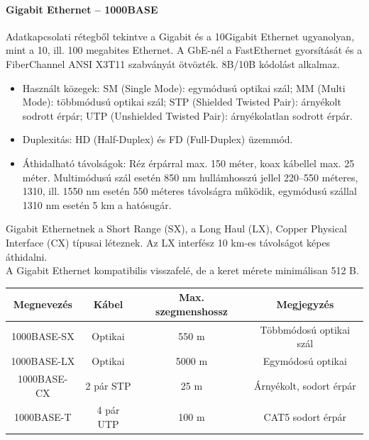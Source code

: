 \paragraph{Gigabit Ethernet -- 1000BASE}
Adatkapcsolati rétegből tekintve a Gigabit és a 10Gigabit Ethernet ugyanolyan, mint a 10, ill. 100 megabites Ethernet. A GbE-nél a FastEthernet gyorsítását és a FiberChannel ANSI X3T11 szabványát ötvözték. 8B/10B kódolást alkalmaz.
\begin{itemize}[nosep]
	\item Használt közegek: SM (Single Mode): egymódusú optikai szál; MM (Multi Mode): többmódusú optikai szál; STP (Shielded Twisted Pair): árnyékolt sodrott érpár; UTP (Unshielded Twisted Pair): árnyékolatlan sodrott érpár.
	\item Duplexitás: HD (Half-Duplex) és FD (Full-Duplex) üzemmód.
	\item Áthidalható távolságok: Réz érpárral max. 150 méter, koax kábellel max. 25 méter. Multimódusú szál esetén 850 nm hullámhosszú jellel 220–550 méteres, 1310, ill. 1550 nm esetén 550 méteres távolságra működik, egymódusú szállal 1310 nm esetén 5 km a hatósugár.
\end{itemize}
Gigabit Ethernetnek a Short Range (SX), a Long Haul (LX), Copper Physical Interface (CX) típusai léteznek. Az LX interfész 10 km-es távolságot képes áthidalni.\\
A Gigabit Ethernet kompatibilis visszafelé, de a keret mérete minimálisan 512 B.\\
\begin{tabular}{|c|c|c|c|}
	\hline 
	Megnevezés & Kábel & Max. szegmenshossz & Megjegyzés \\ 
	\hline 
	1000BASE-SX & Optikai & 550 m & Többmódosú optikai szál \\ 
	\hline 
	1000BASE-LX & Optikai & 5000 m & Egymódosú optikai \\ 
	\hline 
	1000BASE-CX & 2 pár STP & 25 m & Árnyékolt, sodort érpár \\ 
	\hline 
	1000BASE-T & 4 pár UTP & 100 m & CAT5 sodort érpár \\ 
	\hline 
\end{tabular} 

